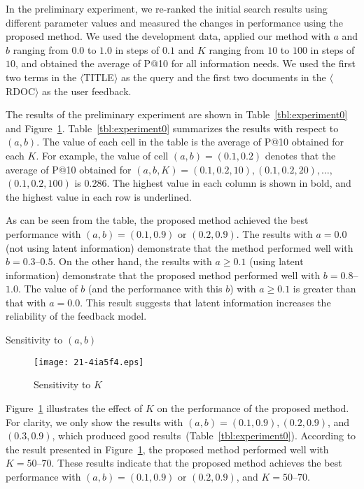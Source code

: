 \documentclass[english]{jnlp_1.4_rep}
\begin{document}
In the preliminary experiment, we re-ranked the initial search results
using different parameter values and measured the changes in performance
using the proposed method. We used the development data, applied our
method with $a$ and $b$ ranging from $0.0$ to $1.0$ in steps of $0.1$
and $K$ ranging from $10$ to $100$ in steps of $10$, and obtained the
average of P@10 for all information needs. We used the first two terms
in the $\langle$TITLE$\rangle$ as the query and the first two documents
in the $\langle$RDOC$\rangle$ as the user feedback.

The results of the preliminary experiment are shown in
Table~\ref{tbl:experiment0} and
Figure~\ref{fig:K}. Table~\ref{tbl:experiment0} summarizes the results
with respect to $(a,b)$. The value of each cell in the table is the
average of P@10 obtained for each $K$. For example, the value of cell
$(a,b) = (0.1,0.2)$ denotes that the average of P@10 obtained for
$(a,b,K) = (0.1,0.2,10), (0.1,0.2,20), \dots,$ $(0.1,0.2,100)$ is
$0.286$. The highest value in each column is shown in bold, and the
highest value in each row is underlined.

As can be seen from the table, the proposed method achieved the best
performance with $(a,b) = (0.1,0.9)$ or $(0.2,0.9)$. The results with $a
= 0.0$ (not using latent information) demonstrate that the method
performed well with $b = 0.3$--$0.5$. On the other hand, the results with
$a \geq 0.1$ (using latent information) demonstrate that the proposed
method performed well with $b = 0.8$--$1.0$. The value of $b$ (and the
performance with this $b$) with $a \geq 0.1$ is greater than that with
$a = 0.0$. This result suggests that latent information increases the
reliability of the feedback model.

\begin{table}[t]
\caption{Sensitivity to $(a,b)$}
\label{tbl:experiment0}

\end{table}

\begin{figure}[t]
 \begin{center}
  \texttt{[image: 21-4ia5f4.eps]}
 \end{center}
  \caption{Sensitivity to $K$}
\label{fig:K}
\end{figure}

Figure~\ref{fig:K} illustrates the effect of $K$ on the performance of
the proposed method. For clarity, 
\linebreak
we only show the results with $(a,b) =
(0.1,0.9), (0.2,0.9)$, and $(0.3,0.9)$, which produced good results~(Table~\ref{tbl:experiment0}). 
According to the result presented in
Figure~\ref{fig:K}, the proposed method performed well with $K = 50$--$70$. 
These results indicate that the proposed method achieves the best
performance with $(a,b) = (0.1,0.9)$ or $(0.2,0.9)$, and $K = 50$--$70$.
\end{document}
